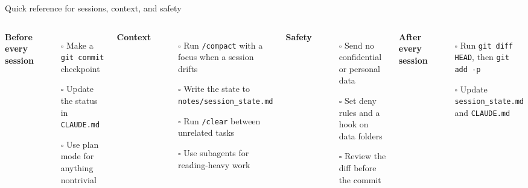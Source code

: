 \documentclass[aspectratio=169,10pt]{beamer}
\begin{document}
\begin{frame}{Quick reference for sessions, context, and safety}
\begin{columns}[T]
\textbf{\textcolor{uzhblue}{Before every session}}
\begin{itemize}\itemsep3pt
  \item[$\square$] Make a \texttt{git commit} checkpoint
  \item[$\square$] Update the status in \texttt{CLAUDE.md}
  \item[$\square$] Use plan mode for anything nontrivial
\end{itemize}
\vspace{0.8em}
\textbf{\textcolor{uzhblue}{Context}}
\begin{itemize}\itemsep3pt
  \item[$\square$] Run \texttt{/compact} with a focus when a session drifts
  \item[$\square$] Write the state to \texttt{notes/session\_state.md}
  \item[$\square$] Run \texttt{/clear} between unrelated tasks
  \item[$\square$] Use subagents for reading-heavy work
\end{itemize}
\textbf{\textcolor{uzhblue}{Safety}}
\begin{itemize}\itemsep3pt
  \item[$\square$] Send no confidential or personal data
  \item[$\square$] Set deny rules and a hook on data folders
  \item[$\square$] Review the diff before the commit
\end{itemize}
\vspace{0.8em}
\textbf{\textcolor{uzhblue}{After every session}}
\begin{itemize}\itemsep3pt
  \item[$\square$] Run \texttt{git diff HEAD}, then \texttt{git add -p}
  \item[$\square$] Update \texttt{session\_state.md} and \texttt{CLAUDE.md}
\end{itemize}
\end{columns}
\end{frame}
\end{document}
